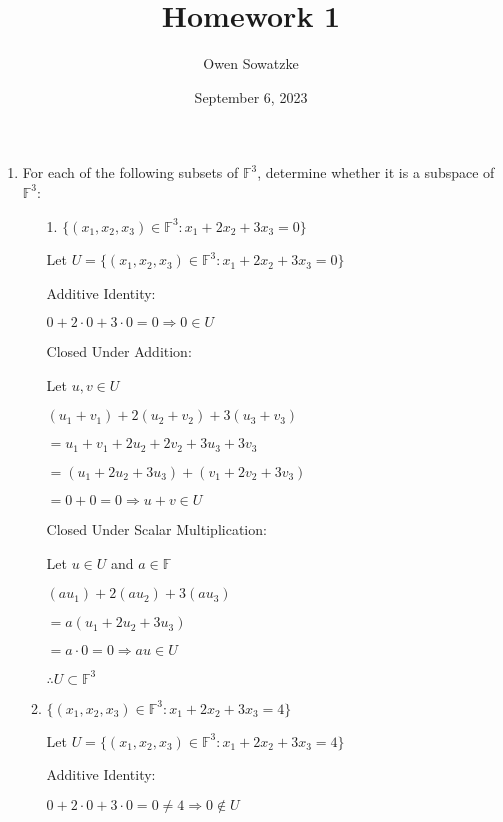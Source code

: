\documentclass{article}
\title{Homework 1}
\author{Owen Sowatzke}
\date{September 6, 2023}
\begin{document}
	\setlength{\abovedisplayskip}{0pt}
	\setlength{\belowdisplayskip}{0pt}
	\setlength{\abovedisplayshortskip}{0pt}
	\setlength{\belowdisplayshortskip}{0pt}
	\doublespacing
	\maketitle
	
	\begin{enumerate}[nolistsep]
	
		\item For each of the following subsets of $\mathbb{F}^3$, determine whether it is a subspace of $\mathbb{F}^3$:
		
		\begin{enumerate}[nolistsep]
		
			\item[1.] ${\{(x_1, x_2, x_3) \in \mathbb{F}^3 : x_1 + 2x_2 + 3x_3 = 0 \}}$
			
			Let $U = {\{(x_1, x_2, x_3) \in \mathbb{F}^3 : x_1 + 2x_2 + 3x_3 = 0 \}}$
			
			Additive Identity:
			
			$ 0 + 2 \cdot 0 + 3 \cdot 0 = 0 \Rightarrow 0 \in U $
			
			Closed Under Addition:
			
			Let $u,v \in U$
			
			$(u_1 + v_1) + 2(u_2 + v_2) + 3(u_3 + v_3)$
			
			$ = u_1 + v_1 + 2u_2 + 2v_2 + 3u_3 + 3v_3$
			
			$ = (u_1 + 2u_2 + 3u_3) + (v_1 + 2v_2 + 3v_3)$
			
			$ = 0 + 0 = 0 \Rightarrow u + v \in U$
			
			Closed Under Scalar Multiplication:
			
			Let $u \in U$ and $a \in \mathbb{F}$
			
			$(au_1) + 2(au_2) + 3(au_3)$
			
			$ = a(u_1 + 2u_2 + 3u_3)$
			
			$ = a \cdot 0 = 0 \Rightarrow au \in U$
			
			$ \therefore U \subset \mathbb{F}^3$
			
			\item ${\{(x_1, x_2, x_3) \in \mathbb{F}^3 : x_1 + 2x_2 + 3x_3 = 4 \}}$
			
			Let $U = {\{(x_1, x_2, x_3) \in \mathbb{F}^3 : x_1 + 2x_2 + 3x_3 = 4 \}}$
			
			Additive Identity:
			
			$0 + 2 \cdot 0 + 3 \cdot 0 = 0 \neq 4 \Rightarrow 0 \notin U$
			

\end{enumerate}
\end{enumerate}
\end{document}
